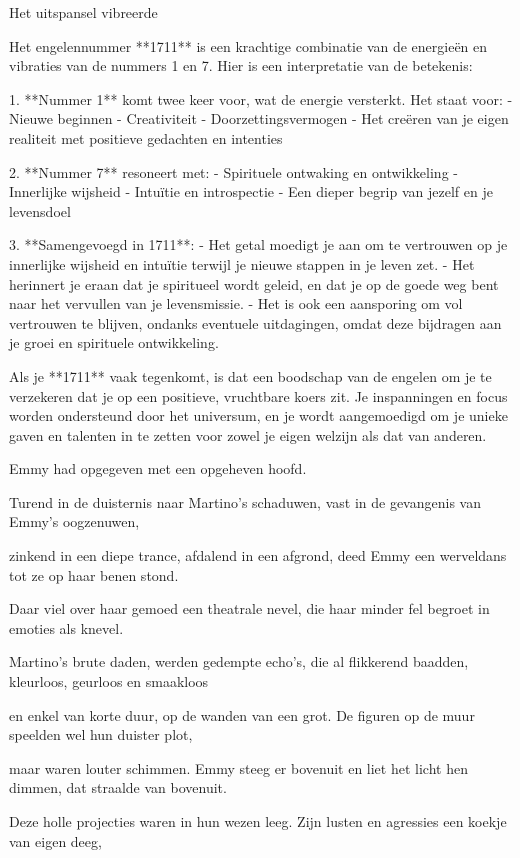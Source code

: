 Het uitspansel vibreerde

Het engelennummer **1711** is een krachtige combinatie van de energieën en vibraties van de nummers 1 en 7. Hier is een interpretatie van de betekenis:

1. **Nummer 1** komt twee keer voor, wat de energie versterkt. Het staat voor:
- Nieuwe beginnen
- Creativiteit
- Doorzettingsvermogen
- Het creëren van je eigen realiteit met positieve gedachten en intenties

2. **Nummer 7** resoneert met:
- Spirituele ontwaking en ontwikkeling
- Innerlijke wijsheid
- Intuïtie en introspectie
- Een dieper begrip van jezelf en je levensdoel

3. **Samengevoegd in 1711**:
- Het getal moedigt je aan om te vertrouwen op je innerlijke wijsheid en intuïtie terwijl je nieuwe stappen in je leven zet.
- Het herinnert je eraan dat je spiritueel wordt geleid, en dat je op de goede weg bent naar het vervullen van je levensmissie.
- Het is ook een aansporing om vol vertrouwen te blijven, ondanks eventuele uitdagingen, omdat deze bijdragen aan je groei en spirituele ontwikkeling.

Als je **1711** vaak tegenkomt, is dat een boodschap van de engelen om je te verzekeren dat je op een positieve, vruchtbare koers zit. Je inspanningen en focus worden ondersteund door het universum, en je wordt aangemoedigd om je unieke gaven en talenten in te zetten voor zowel je eigen welzijn als dat van anderen.

Emmy had opgegeven
met een opgeheven hoofd.

Turend in de duisternis
naar Martino’s schaduwen,
vast in de gevangenis
van Emmy’s oogzenuwen,

zinkend in een diepe trance,
afdalend in een afgrond,
deed Emmy een werveldans
tot ze op haar benen stond.

Daar viel over haar gemoed
een theatrale nevel,
die haar minder fel begroet
in emoties als knevel.

Martino’s brute daden,
werden gedempte echo's,
die al flikkerend baadden,
kleurloos, geurloos en smaakloos

en enkel van korte duur,
op de wanden van een grot.
De figuren op de muur
speelden wel hun duister plot,

maar waren louter schimmen.
Emmy steeg er bovenuit
en liet het licht hen dimmen,
dat straalde van bovenuit.

Deze holle projecties
waren in hun wezen leeg.
Zijn lusten en agressies
een koekje van eigen deeg,

